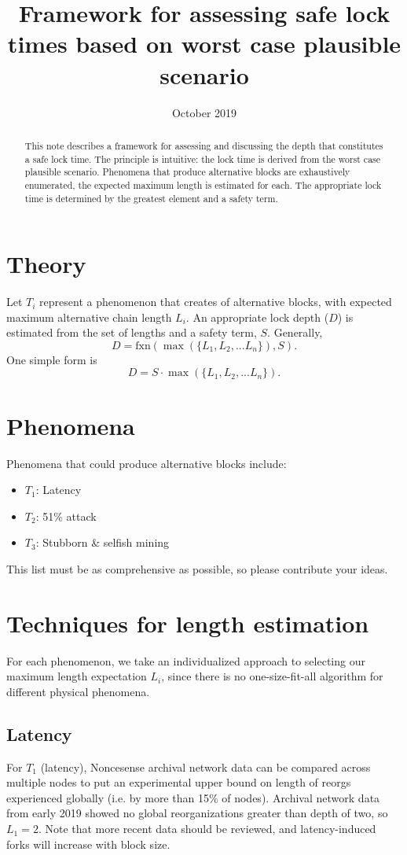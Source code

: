 \documentclass{mrl}
\title{Framework for assessing safe lock times based on worst case plausible scenario}
\date{October 2019}
\begin{document}
\vspace{-0.25cm}
\begin{abstract}
This note describes a framework for assessing and discussing the depth that constitutes a safe lock time. The principle is intuitive: the lock time is derived from the worst case plausible scenario. Phenomena that produce alternative blocks are exhaustively enumerated, the expected maximum length is estimated for each. The appropriate lock time is determined by the greatest element and a safety term.
\end{abstract}

\section{Theory} \label{sec_theory}
Let $T_i$ represent a phenomenon that creates of alternative blocks, with expected maximum alternative chain length $L_i$. An appropriate lock depth ($D$) is estimated from the set of lengths and a safety term, $S$. Generally,
\begin{equation}D = \mathrm{fxn}(\max(\{L_1, L_2, ... L_n\}), S). \label{D_gen} \end{equation}
One simple form is
\begin{equation}D = S\cdot\max(\{L_1, L_2, ... L_n\}). \label{D_mult} \end{equation}

\section{Phenomena}
Phenomena that could produce alternative blocks include:
\begin{itemize}
    \item $T_1$: Latency
    \item $T_2$: 51\% attack
    \item $T_3$: Stubborn \& selfish mining
\end{itemize}

This list must be as comprehensive as possible, so please contribute your ideas.

\section{Techniques for length estimation}
For each phenomenon, we take an individualized approach to selecting our maximum length expectation $L_i$, since there is no one-size-fit-all algorithm for different physical phenomena.

\subsection{Latency}
For $T_1$ (latency), Noncesense archival network data can be compared across multiple nodes to put an experimental upper bound on length of reorgs experienced globally (i.e. by more than 15\% of nodes). Archival network data from early 2019 showed no global reorganizations greater than depth of two, so $L_1 = 2$. Note that more recent data should be reviewed, and latency-induced forks will increase with block size. 
\end{document}
